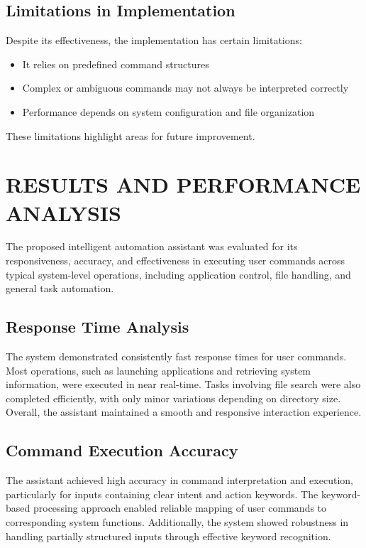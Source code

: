 \documentclass[conference]{IEEEtran}
\begin{document}
\subsection{Limitations in Implementation}
\noindent
Despite its effectiveness, the implementation has certain limitations:

\begin{itemize}
    \item It relies on predefined command structures
    \item Complex or ambiguous commands may not always be interpreted correctly
    \item Performance depends on system configuration and file organization
\end{itemize}
\noindent
These limitations highlight areas for future improvement.


\section{\large RESULTS AND PERFORMANCE ANALYSIS}
\noindent
The proposed intelligent automation assistant was evaluated for its responsiveness, accuracy, and effectiveness in executing user commands across typical system-level operations, including application control, file handling, and general task automation.

\subsection{Response Time Analysis}
\noindent
The system demonstrated consistently fast response times for user commands. Most operations, such as launching applications and retrieving system information, were executed in near real-time. Tasks involving file search were also completed efficiently, with only minor variations depending on directory size. Overall, the assistant maintained a smooth and responsive interaction experience.

\subsection{Command Execution Accuracy}
\noindent
The assistant achieved high accuracy in command interpretation and execution, particularly for inputs containing clear intent and action keywords. The keyword-based processing approach enabled reliable mapping of user commands to corresponding system functions. Additionally, the system showed robustness in handling partially structured inputs through effective keyword recognition.
\end{document}
